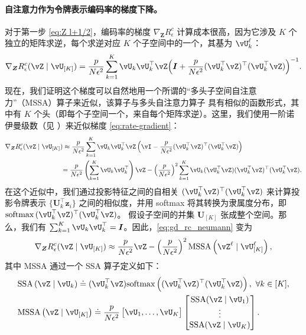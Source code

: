 \documentclass[../../book-main_zh.tex]{subfiles}
\begin{document}
\paragraph{自注意力作为令牌表示编码率的梯度下降。} 对于第一步 \eqref{eq:Z l+1/2}，编码率的梯度 \(\nabla_{\bm Z} R^c_\epsilon\) 计算成本很高，因为它涉及 \(K\) 个独立的矩阵求逆，每个求逆对应 \(K\) 个子空间中的一个，其基为 \(\vU_{k}^{\ell}\)：
\begin{equation}
    \nabla_{\bm Z} R_{\epsilon}^c(\vZ \mid \vU_{[K]})
    = \frac{p}{N\epsilon^2}\sum_{k=1}^K \vU_k\vU_k^\top\vZ\Big(\I +
    \frac{p}{N\epsilon^2}(\vU_k^\top\vZ)^\top(\vU_k^\top\vZ)\Big)^{-1}.
    \label{eq:rate-gradient}
\end{equation}
现在，我们证明这个梯度可以自然地用一个所谓的“多头子空间自注意力”（MSSA）算子来近似，该算子与多头自注意力算子 \citep{vaswani2017attention} 具有相似的函数形式，其中有 \(K\) 个头（即每个子空间一个，来自每个矩阵求逆）。这里，我们使用一阶诺伊曼级数（见 ）来近似梯度 \eqref{eq:rate-gradient}：
\begin{align}\label{eq:gd_rc_neumann}
    \nabla_{\bm Z} R_{\epsilon}^{c}(\vZ \mid \vU_{[K]})
    &\approx \frac{p}{N\epsilon^2} \sum_{k = 1}^{K}\vU_{k}\vU_{k}^\top\vZ\left(\vI - \frac{p}{N\epsilon^2} (\vU_{k}^\top\vZ)^\top(\vU_{k}^\top\vZ)\right) \notag \\
    &{= \frac{p}{N\epsilon^2} \left(\sum_{k = 1}^{K} \vU_{k}\vU_{k}^\top\right)\vZ -  \left( \frac{p}{N\epsilon^2}\right)^2\sum_{k = 1}^{K} \vU_{k}(\vU_{k}^\top\vZ)(\vU_{k}^\top\vZ)^\top(\vU_{k}^\top\vZ)}.
\end{align}
在这个近似中，我们通过投影特征之间的自相关 $(\vU_{k}^\top\vZ)^\top(\vU_{k}^\top\vZ)$ 来计算投影令牌表示 $\{\bm U_k^\top\bm z_i\}$ 之间的相似度，并用 softmax 将其转换为隶属度分布，即 $\softmax{(\vU_{k}^\top\vZ)^\top(\vU_{k}^\top\vZ)}$。
假设子空间的并集 $\bm U_{[K]}$ 张成整个空间。那么，我们有 $\sum_{k = 1}^{K} \vU_{k}\vU_{k}^\top = \bm I$。因此，\eqref{eq:gd_rc_neumann} 变为
\begin{align}\label{eq:grad Rc}
    \nabla_{\bm Z} R_{\epsilon}^{c}(\vZ \mid \vU_{[K]})
     \approx  \frac{p}{N\epsilon^2} \vZ -  \left( \frac{p}{N\epsilon^2}\right)^2 \MSSA\left(\vZ^{\ell} \mid \vU_{[K]}^{\ell}\right),
\end{align}
其中 MSSA 通过一个 SSA 算子定义如下：
\begin{align}
    & \mathrm{SSA}\left(\vZ \mid \vU_{k}\right)
    \doteq (\vU_{k}^\top \vZ)\mathrm{softmax}\left((\vU_{k}^\top\vZ)^\top(\vU_{k}^\top\vZ)\right), \ \forall k \in [K], \label{eq:SSA} \\
    & \mathrm{MSSA}\left(\vZ \mid \vU_{[K]}\right)
    \doteq \frac{p}{N\epsilon^2} \mat{\vU_{1}, \dots, \vU_{K}}\mat{\mathrm{SSA}({\vZ \mid \vU_{1}}) \\ \vdots \\ \mathrm{SSA}({\vZ \mid \vU_{K}})}.\label{eq:Multi-Head-SSA}
\end{align}
\end{document}
